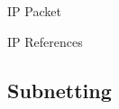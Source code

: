 \begin{frame}{IP Packet}
  \begin{center}
  \end{center}
\end{frame}

\begin{frame}{IP References}
  \begin{refsection}
    \nocite{wiki:ip, wiki:ipaddr, rfc791, wiki:ipv4hdrchksum} \printbibliography[heading=none]
  \end{refsection}
\end{frame}




\subsection{Subnetting}

